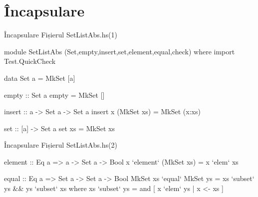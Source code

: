 \documentclass[xcolor=pdftex,romanian,colorlinks]{beamer}
\begin{document}
%
%
%
%
%
%
%
%
%
%
%
%
%
%
%
%
%
%
%
%
%
%
%
%
%
%
%
%
%
%
%
%
%
%
%
%
%
\section{Încapsulare}

\begin{frame}[fragile]{Încapsulare}
{Fișierul SetListAbs.hs\hfill (1)}
\begin{asciihs}
module SetListAbs
(Set,empty,insert,set,element,equal,check) where
import Test.QuickCheck

data Set a   =  MkSet [a]

empty :: Set a
empty = MkSet []

insert :: a -> Set a -> Set a
insert x (MkSet xs) = MkSet (x:xs)

set :: [a] -> Set a
set xs = MkSet xs
\end{asciihs}
\end{frame}


\begin{frame}[fragile]{Încapsulare}
{Fișierul SetListAbs.hs\hfill (2)}
\begin{asciihs}
element :: Eq a => a -> Set a -> Bool
x `element` (MkSet xs) = x `elem` xs

equal :: Eq a => Set a -> Set a -> Bool
MkSet xs `equal` MkSet ys =
    xs `subset` ys && ys `subset` xs
  where
    xs `subset` ys = and [ x `elem` ys | x <- xs ]
\end{asciihs}
\end{frame}
\end{document}
